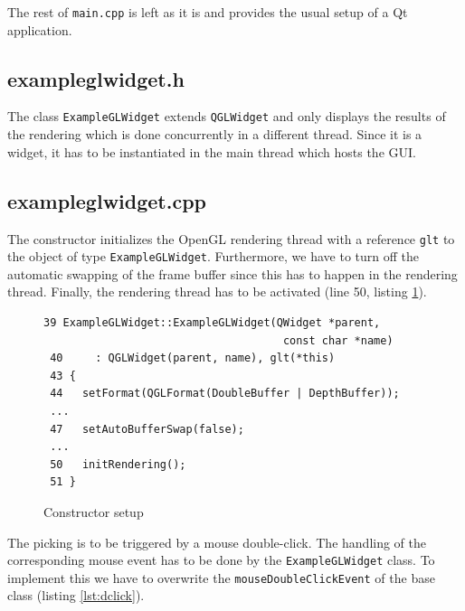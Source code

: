 \documentclass[jou,noapacite]{apa}
\begin{document}
The rest of \lstinline|main.cpp| is left as it is and provides the usual setup
of a Qt application.


\subsection{exampleglwidget.h}

The class \lstinline|ExampleGLWidget| extends \lstinline|QGLWidget| and only
displays the results of the rendering which is done concurrently in a different
thread.
%
Since it is a widget, it has to be instantiated in the main thread which hosts
the GUI.

\subsection{exampleglwidget.cpp}

The constructor initializes the OpenGL rendering thread with a
reference \lstinline|glt| to the object of type \lstinline|ExampleGLWidget|.
%
Furthermore, we have to turn off the automatic swapping of the frame buffer
since this has to happen in the rendering thread. Finally, the rendering thread
has to be activated (line 50, listing \ref{lst:ctor}).
%
\begin{figure}[h]
\begin{lstlisting}[basicstyle=\scriptsize]
 39 ExampleGLWidget::ExampleGLWidget(QWidget *parent,
                                     const char *name)
 40     : QGLWidget(parent, name), glt(*this)
 43 {
 44   setFormat(QGLFormat(DoubleBuffer | DepthBuffer));
 ...
 47   setAutoBufferSwap(false);
 ...
 50   initRendering();
 51 }
\end{lstlisting}
\caption{Constructor setup}
\label{lst:ctor}
\end{figure}

The picking is to be triggered by a mouse double-click.
%
The handling of the corresponding mouse event has to be done by
the \lstinline|ExampleGLWidget| class.
%
To implement this we have to overwrite the \lstinline|mouseDoubleClickEvent| of
the base class (listing \ref{lst:dclick}).
\end{document}
